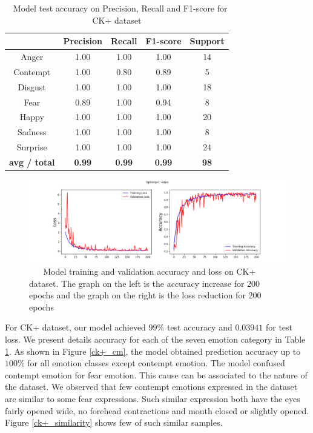 \documentclass[master]{thesis-uestc}
\begin{document}
\begin{table}[ht]
\renewcommand{\arraystretch}{1.3}
\caption{\,\,\,\,\,Model test accuracy on Precision, Recall and F1-score for CK+ dataset}
\label{table_ck+_scores}
\begin{center}
\begin{tabular}{|c|c|c|c|c|}

\hline
 & Precision & Recall & F1-score & Support\\ \hline

Anger & 1.00 & 1.00 & 1.00 & 14\\ \hline
Contempt & 1.00 & 0.80 & 0.89 & 5\\ \hline
Disgust & 1.00 & 1.00 & 1.00 & 18\\ \hline
Fear & 0.89 & 1.00 & 0.94 & 8\\ \hline
Happy & 1.00 & 1.00 & 1.00 & 20\\ \hline
Sadness & 1.00 & 1.00 & 1.00 & 8\\ \hline
Surprise & 1.00 & 1.00 & 1.00 & 24\\ \hline

\textbf{avg / total} & \textbf{0.99} & \textbf{0.99} & \textbf{0.99} & \textbf{98}\\ \hline
\end{tabular}
\end{center}
\end{table}

\begin{figure}[ht]
\includegraphics[width=6.5in]{pic/XK+_accuracy_and_loss.png}
\caption{\,\,\,\,\,\,\,\,\,\,Model training and validation accuracy and loss on CK+ dataset. The graph on the left is the accuracy increase for 200 epochs and the graph on the right is the loss reduction for 200 epochs}
\label{ck+accuracy_loss}
\end{figure}

For CK+ dataset, our model achieved $99\%$ test accuracy and $0.03941$ for test loss. We present details accuracy for each of the seven emotion category in Table \ref{table_ck+_scores}. As shown in Figure \ref{ck+_cm}, the model obtained prediction accuracy up to $100\%$ for all emotion classes except contempt emotion. The model confused contempt emotion for fear emotion. This cause can be associated to the nature of the dataset. We observed that few contempt emotions expressed in the dataset are similar to some fear expressions. Such similar expression both have the eyes fairly opened wide, no forehead contractions and mouth closed or slightly opened. Figure \ref{ck+_similarity} shows few of such similar samples.
\end{document}
